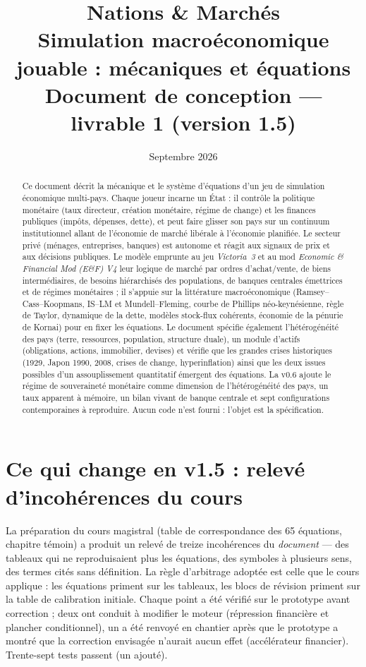 \documentclass[11pt,a4paper]{article}
\title{\textbf{Nations \& Marchés}\\[4pt]
\large Simulation macroéconomique jouable : mécaniques et équations\\[2pt]
\normalsize Document de conception --- livrable 1 (version 1.5)}
\author{}
\date{Septembre 2026}
\begin{document}
\maketitle

\begin{abstract}
\noindent Ce document décrit la mécanique et le système d'équations d'un jeu de simulation économique multi-pays. Chaque joueur incarne un État : il contrôle la politique monétaire (taux directeur, création monétaire, régime de change) et les finances publiques (impôts, dépenses, dette), et peut faire glisser son pays sur un continuum institutionnel allant de l'économie de marché libérale à l'économie planifiée. Le secteur privé (ménages, entreprises, banques) est autonome et réagit aux signaux de prix et aux décisions publiques. Le modèle emprunte au jeu \emph{Victoria~3} et au mod \emph{Economic \& Financial Mod (E\&F) V4} leur logique de marché par ordres d'achat/vente, de biens intermédiaires, de besoins hiérarchisés des populations, de banques centrales émettrices et de régimes monétaires ; il s'appuie sur la littérature macroéconomique (Ramsey--Cass--Koopmans, IS--LM et Mundell--Fleming, courbe de Phillips néo-keynésienne, règle de Taylor, dynamique de la dette, modèles stock-flux cohérents, économie de la pénurie de Kornai) pour en fixer les équations. Le document spécifie également l'hétérogénéité des pays (terre, ressources, population, structure duale), un module d'actifs (obligations, actions, immobilier, devises) et vérifie que les grandes crises historiques (1929, Japon 1990, 2008, crises de change, hyperinflation) ainsi que les deux issues possibles d'un assouplissement quantitatif émergent des équations. La v0.6 ajoute le régime de souveraineté monétaire comme dimension de l'hétérogénéité des pays, un taux apparent à mémoire, un bilan vivant de banque centrale et sept configurations contemporaines à reproduire. Aucun code n'est fourni : l'objet est la spécification.
\end{abstract}

\tableofcontents
\newpage
\section*{Ce qui change en v1.5 : relevé d'incohérences du cours}
La préparation du cours magistral (table de correspondance des 65 équations, chapitre témoin) a produit un relevé de treize incohérences du \emph{document} — des tableaux qui ne reproduisaient plus les équations, des symboles à plusieurs sens, des termes cités sans définition. La règle d'arbitrage adoptée est celle que le cours applique : les équations priment sur les tableaux, les blocs de révision priment sur la table de calibration initiale. Chaque point a été vérifié sur le prototype avant correction ; deux ont conduit à modifier le moteur (répression financière et plancher conditionnel), un a été renvoyé en chantier après que le prototype a montré que la correction envisagée n'aurait aucun effet (accélérateur financier). Trente-sept tests passent (un ajouté).
\end{document}
